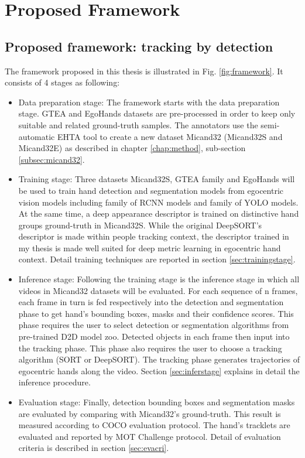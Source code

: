 \chapter{Proposed Framework}\label{chap:framework}
\section{Proposed framework: tracking by detection}
The framework proposed in this thesis is illustrated in Fig. \ref{fig:framework}. It consists of 4 stages as following:
\begin{itemize}
	
	\item Data preparation stage: The framework starts with the data preparation stage. GTEA and EgoHands datasets are pre-processed in order to keep only suitable and related ground-truth samples. The annotators use the semi-automatic EHTA tool to create a new dataset Micand32 (Micand32S and Micand32E) as described in chapter \ref{chap:method}, sub-section \ref{subsec:micand32}.
	\item Training stage: Three datasets Micand32S, GTEA family and EgoHands will be used to train hand detection and segmentation models from egocentric vision models including family of RCNN models and family of YOLO models. At the same time, a deep appearance descriptor is trained on distinctive hand groups ground-truth in Micand32S. While the original DeepSORT's descriptor is made within people tracking context, the descriptor trained in my thesis is made well suited for deep metric learning in egocentric hand context. Detail training techniques are reported in section \ref{sec:trainingstage}.
	\item Inference stage: Following the training stage is the inference stage in which all videos in Micand32 datasets will be evaluated. For each sequence of n frames, each frame in turn is fed respectively into the detection and segmentation phase to get hand’s bounding boxes, masks and their confidence scores. This phase requires the user to select detection or segmentation algorithms from pre-trained D2D model zoo. Detected objects in each frame then input into the tracking phase. This phase also requires the user to choose a tracking algorithm (SORT or DeepSORT). The tracking phase generates trajectories of egocentric hands along the video. Section \ref{sec:inferstage} explains in detail the inference procedure.
	\item Evaluation stage: Finally, detection bounding boxes and segmentation masks are evaluated by comparing with Micand32’s ground-truth. This result is measured according to COCO evaluation protocol. The hand’s tracklets are evaluated and reported by MOT Challenge protocol. Detail of evaluation criteria is described in section \ref{sec:evacri}.
\end{itemize}
